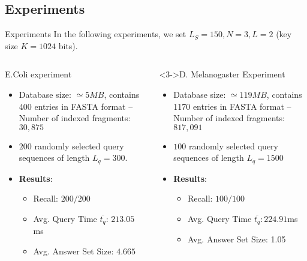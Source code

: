 \documentclass[9pt]{beamer}
\begin{document}
\subsection{Experiments}
\begin{frame}{Experiments}
	In the following experiments, we set $L_S = 150, N = 3, L = 2$ (key size $K = 1024$ bits).
	\begin{columns}
		\begin{column}{0.5\textwidth}  %
			\begin{block}{E.Coli experiment}
				\begin{itemize}
					\item Database size: $\simeq 5 MB$, contains 400 entries in FASTA format -- Number of indexed fragments: $30,875$
					\item $200$ randomly selected query sequences of length $L_q = 300$.
					\item<2->{\textbf{Results}:
						\begin{itemize}
							\item Recall: $ 200 / 200 $ 
							\item Avg. Query Time $\overline{t_q}$: $213.05$ ms
							\item Avg. Answer Set Size: $4.665$
						\end{itemize}
					}
				\end{itemize}
			\end{block}	
		\end{column}
	\begin{column}{0.5\textwidth}
		\begin{block}<3->{D. Melanogaster Experiment}
			\begin{itemize}
				\item Database size: $\simeq 119 MB$, contains 1170 entries in FASTA format -- Number of indexed fragments: $817,091$
				\item $100$ randomly selected query sequences of length $L_q = 1500$ 
				\item<4->{\textbf{Results}:
					\begin{itemize}
						\item Recall: $ 100 / 100 $
						\item Avg. Query Time $\overline{t_q}: 224.91 $ms
						\item Avg. Answer Set Size: 1.05
					\end{itemize}
				}
			\end{itemize}
		\end{block}
	\end{column}	
	\end{columns}
\end{frame}
\end{document}
